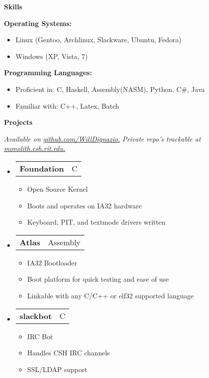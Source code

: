 \documentclass[letterpaper,11pt]{article}
\makeatletter
\newcommand{\resheading}[1]{{\large \colorbox{mygrey}{\begin{minipage}{\textwidth}{\textbf{#1 \vphantom{p\^{E}}}}\end{minipage}}}}
\newcommand{\restwosubheading}[2]{
\begin{tabular*}{6.5in}{l@{\extracolsep{\fill}}r}
		\textbf{#1} & #2 \\
\end{tabular*}\vspace{-6pt}}
\makeatother
\begin{document}
\resheading{{Skills}}
{ \footnotesize
	\begin{description}
		\item{\textbf{Operating Systems: }}
			\begin{itemize}
				\item{Linux (Gentoo, Archlinux, Slackware, Ubuntu, Fedora)}
				\item{Windows (XP, Vista, 7)}
			\end{itemize}
		\item{\textbf{Programming Languages: }}
			\begin{itemize}
				\item{Proficient in: }{C, Haskell, Assembly(NASM), Python, C\#, Java}
				\item{Familiar with: }{C++, Latex, Batch}
			\end{itemize}
	\end{description}
}
\resheading{Projects}
{ \footnotesize
	\textit{Available on {\href{http://www.github.com/WillDignazio/}{github.com/WillDignazio.}}}
	\textit{Private repo's trackable at {\href{http://monolith.csh.rit.edu:8080/cgit.cgi/}{monolith.csh.rit.edu.}}}
	\begin{itemize}
		\item 
		\restwosubheading{Foundation}{C}
			\begin{itemize}
				\item{Open Source Kernel}
				\item{Boots and operates on IA32 hardware}
				\item{Keyboard, PIT, and textmode drivers written}
			\end{itemize}
		\item		
		\restwosubheading{Atlas}{Assembly}
			\begin{itemize}
				\item{IA32 Bootloader} 
				\item{Boot platform for quick testing and ease of use}
				\item{Linkable with any C/C++ or elf32 supported language}
			\end{itemize}
		\item
		\restwosubheading{slackbot}{C}
			\begin{itemize}
				\item{IRC Bot} 
				\item{Handles CSH IRC channels}
				\item{SSL/LDAP support}
			\end{itemize}
	\end{itemize}
}

\end{document}
